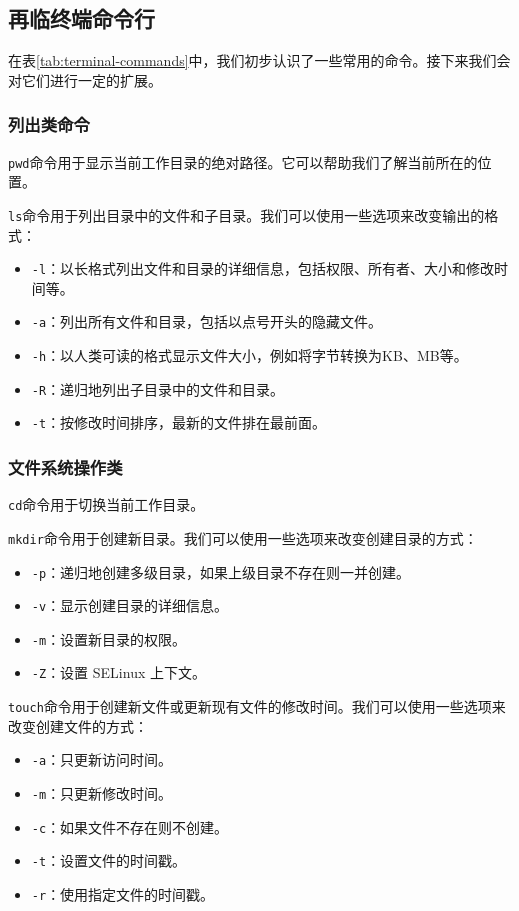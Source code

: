 \documentclass[../main.tex]{subfiles}
\begin{document}
\subsection{再临终端命令行}

在表\ref{tab:terminal-commands}中，我们初步认识了一些常用的命令。接下来我们会对它们进行一定的扩展。

\subsubsection{列出类命令}

\texttt{pwd}命令用于显示当前工作目录的绝对路径。它可以帮助我们了解当前所在的位置。

\texttt{ls}命令用于列出目录中的文件和子目录。我们可以使用一些选项来改变输出的格式：

\begin{itemize}
  \item \texttt{-l}：以长格式列出文件和目录的详细信息，包括权限、所有者、大小和修改时间等。
  \item \texttt{-a}：列出所有文件和目录，包括以点号开头的隐藏文件。
  \item \texttt{-h}：以人类可读的格式显示文件大小，例如将字节转换为KB、MB等。
  \item \texttt{-R}：递归地列出子目录中的文件和目录。
  \item \texttt{-t}：按修改时间排序，最新的文件排在最前面。
\end{itemize}

\subsubsection{文件系统操作类}

\texttt{cd}命令用于切换当前工作目录。

\texttt{mkdir}命令用于创建新目录。我们可以使用一些选项来改变创建目录的方式：
\begin{itemize}
  \item \texttt{-p}：递归地创建多级目录，如果上级目录不存在则一并创建。
  \item \texttt{-v}：显示创建目录的详细信息。
  \item \texttt{-m}：设置新目录的权限。
  \item \texttt{-Z}：设置 SELinux 上下文。
\end{itemize}

\texttt{touch}命令用于创建新文件或更新现有文件的修改时间。我们可以使用一些选项来改变创建文件的方式：
\begin{itemize}
  \item \texttt{-a}：只更新访问时间。
  \item \texttt{-m}：只更新修改时间。
  \item \texttt{-c}：如果文件不存在则不创建。
  \item \texttt{-t}：设置文件的时间戳。
  \item \texttt{-r}：使用指定文件的时间戳。
\end{itemize}
\end{document}
